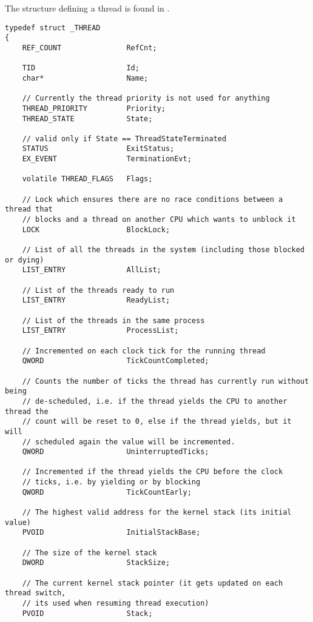 \begin{appendices}
The structure defining a thread is found in .
\begin{lstlisting}[caption={Thread structure},label={lst:ThreadStruct}]
typedef struct _THREAD
{
    REF_COUNT               RefCnt;

    TID                     Id;
    char*                   Name;

    // Currently the thread priority is not used for anything
    THREAD_PRIORITY         Priority;
    THREAD_STATE            State;

    // valid only if State == ThreadStateTerminated
    STATUS                  ExitStatus;
    EX_EVENT                TerminationEvt;

    volatile THREAD_FLAGS   Flags;

    // Lock which ensures there are no race conditions between a thread that
    // blocks and a thread on another CPU which wants to unblock it
    LOCK                    BlockLock;

    // List of all the threads in the system (including those blocked or dying)
    LIST_ENTRY              AllList;

    // List of the threads ready to run
    LIST_ENTRY              ReadyList;

    // List of the threads in the same process
    LIST_ENTRY              ProcessList;

    // Incremented on each clock tick for the running thread
    QWORD                   TickCountCompleted;

    // Counts the number of ticks the thread has currently run without being
    // de-scheduled, i.e. if the thread yields the CPU to another thread the
    // count will be reset to 0, else if the thread yields, but it will
    // scheduled again the value will be incremented.
    QWORD                   UninterruptedTicks;

    // Incremented if the thread yields the CPU before the clock
    // ticks, i.e. by yielding or by blocking
    QWORD                   TickCountEarly;

    // The highest valid address for the kernel stack (its initial value)
    PVOID                   InitialStackBase;

    // The size of the kernel stack
    DWORD                   StackSize;

    // The current kernel stack pointer (it gets updated on each thread switch,
    // its used when resuming thread execution)
    PVOID                   Stack;


\end{lstlisting}
\end{appendices}
